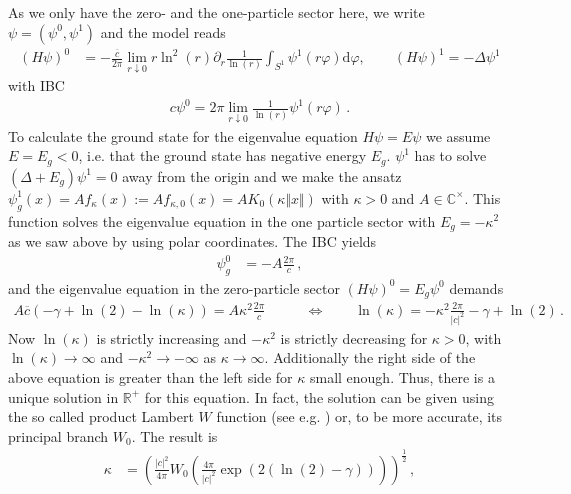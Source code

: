 As we only have the zero- and the one-particle sector here, we write $\psi = (\psi^{0},\psi^{1})$ and the model reads
\begin{align*}
  (H\psi)^{0}
  &=
  -
  \frac{\overline{c}}{2\pi}
  \lim_{r \downarrow 0}
  r\ln^{2}(r)
  \partial_{r}
  \frac{1}{\ln(r)}
  \int_{S^{1}}
  \psi^{1}
  \left(
    r\varphi
  \right)
  \mathrm{d}\varphi
  ,\qquad
  (H\psi)^{1}
  =
  -
  \Delta
  \psi^{1}
\end{align*}
with IBC
\begin{align*}
  c
  \psi^{0}
  =
  2\pi
  \lim_{r \downarrow 0}
  \frac{1}{\ln(r)}
  \psi^{1}
  \left(
    r\varphi
  \right)
  \,.
\end{align*}
To calculate the ground state for the eigenvalue equation $H\psi = E\psi$ we assume $E = E_{g} < 0$, i.e. that the ground state has negative energy $E_{g}$. $\psi^{1}$ has to solve $(\Delta + E_{g})\psi^{1} = 0$ away from the origin and we make the ansatz $\psi_{g}^{1}(x) = Af_{\kappa}(x) := Af_{\kappa,0}(x) = AK_{0}(\kappa\Vert x \Vert)$ with $\kappa > 0$ and $A \in \mathbb{C}^{\times}$. This function solves the eigenvalue equation in the one particle sector with $E_{g} = -\kappa^{2}$ as we saw above by using polar coordinates. The IBC yields
\begin{align*}
  \psi_{g}^{0}
  &=
  -
  A
  \frac{2\pi}{c}
  \,,
\end{align*}
and the eigenvalue equation in the zero-particle sector $(H\psi)^{0} = E_{g}\psi^{0}$ demands
\begin{align*}
  A
  \overline{c}
  \left(
    -
    \gamma
    +
    \ln(2)
    -
    \ln(\kappa)
  \right)
  =
  A\kappa^{2}
  \frac{2\pi}{c}
  \qquad
  &\Leftrightarrow
  \qquad
  \ln(\kappa)
  =
  -
  \kappa^{2}
  \frac{2\pi}{\vert c \vert^{2}}
  -
  \gamma
  +
  \ln(2)
  \,.
\end{align*}
Now $\ln(\kappa)$ is strictly increasing and $-\kappa^{2}$ is strictly decreasing for $\kappa > 0$, with $\ln(\kappa) \to \infty$ and $-\kappa^{2} \to -\infty$ as $\kappa \to \infty$. Additionally the right side of the above equation is greater than the left side for $\kappa$ small enough. Thus, there is a unique solution in $\mathbb{R}^{+}$ for this equation. In fact, the solution can be given using the so called product Lambert $W$ function (see e.g. \cite{1af276f4}) or, to be more accurate, its principal branch $W_{0}$. The result is
\begin{align*}
  \kappa
  &=
  \left(
    \frac{\vert c \vert^{2}}{4\pi}
    W_{0}
    \left(
      \frac{4\pi}{\vert c \vert^{2}}
      \exp(2(\ln(2) - \gamma))
    \right)
  \right)^{\frac{1}{2}}
  \,,
\end{align*}

